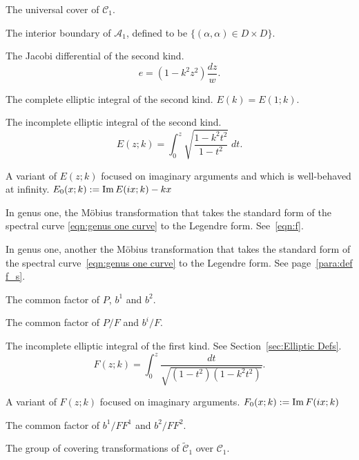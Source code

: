 \begin{description}[align=right]
\item[$\mathcal{\tilde{C}}_1$] The universal cover of $\mathcal{C}_1$.

\item[$\mathcal{D}$] The interior boundary of $\mathcal{A}_1$, defined to be $\{ (α,α) \in D \times D\}$.

\item[$e$] The Jacobi differential of the second kind.
\[
e = (1-k^2z^2) \frac{dz}{w}.
\]

\item[$E(k)$] The complete elliptic integral of the second kind. $E(k) = E(1;k)$.

\item[$E(z;k)$] The incomplete elliptic integral of the second kind.
\[
E(z;k) = \int_0^z \sqrt{\frac{1-k^2 t^2}{1-t^2}} \;dt.
\]

\item[$E_0(x;k)$] A variant of $E(z;k)$ focused on imaginary arguments and which is well-behaved at infinity. $E_0 (x ; k) := \operatorname{Im} E(i x; k) - kx$

\item[$f(ζ)$] In genus one, the M\"obius transformation that takes the standard form of the spectral curve \eqref{eqn:genus one curve} to the Legendre form. See~\eqref{eqn:f}.

\item[$f_s(ζ)$] In genus one, another the M\"obius transformation that takes the standard form of the spectral curve~\eqref{eqn:genus one curve} to the Legendre form. See page~\ref{para:def f_s}.

\item[$F$] The common factor of $P$, $b^1$ and $b^2$.
\item[$F^i$] The common factor of $P/F$ and $b^i/F$.

\item[$F(z;k)$] The incomplete elliptic integral of the first kind. See Section~\ref{sec:Elliptic Defs}.
\[
F(z;k) = \int_0^z \frac{dt}{\sqrt{(1-t^2)(1-k^2 t^2)}}.
\]

\item[$F_0(x;k)$] A variant of $F(z;k)$ focused on imaginary arguments. $F_0 (x ; k) := \operatorname{Im} F(i x; k)$

\item[$G$] The common factor of $b^1/FF^1$ and $b^2/FF^2$.

\item[$\mathcal{G}$] The group of covering transformations of $\mathcal{\tilde{C}}_1$ over $\mathcal{C}_1$.


\end{description}
